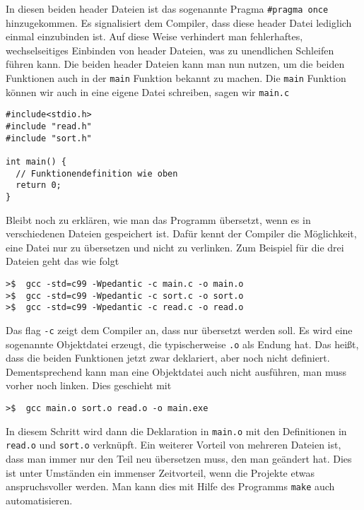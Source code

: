 In diesen beiden header Dateien ist das sogenannte Pragma \verb|#pragma once| hinzugekommen.
Es signalisiert dem Compiler, dass diese header Datei lediglich einmal einzubinden ist.
Auf diese Weise verhindert man fehlerhaftes, wechselseitiges Einbinden von header Dateien, was zu unendlichen Schleifen führen kann.
Die beiden header Dateien kann man nun nutzen, um die beiden Funktionen auch in der \texttt{main} Funktion bekannt zu machen.
Die \texttt{main} Funktion können wir auch in eine eigene Datei schreiben, sagen wir \texttt{main.c}
\begin{lstlisting}[caption={Datei \texttt{main.c}}, belowcaptionskip=0.3em]
#include<stdio.h>
#include "read.h"
#include "sort.h"

int main() {
  // Funktionendefinition wie oben
  return 0;
}
\end{lstlisting}
Bleibt noch zu erklären, wie man das Programm übersetzt, wenn es in verschiedenen Dateien gespeichert ist.
Dafür kennt der Compiler die Möglichkeit, eine Datei nur zu übersetzen und nicht zu verlinken.
Zum Beispiel für die drei Dateien geht das wie folgt

\vspace*{0.5cm}
\begin{verbatim}
>$  gcc -std=c99 -Wpedantic -c main.c -o main.o
>$  gcc -std=c99 -Wpedantic -c sort.c -o sort.o
>$  gcc -std=c99 -Wpedantic -c read.c -o read.o
\end{verbatim}
\vspace*{0.5cm}

Das flag \texttt{-c} zeigt dem Compiler an, dass nur übersetzt werden soll.
Es wird eine sogenannte Objektdatei erzeugt, die typischerweise \texttt{.o} als Endung hat.
Das heißt, dass die beiden Funktionen jetzt zwar deklariert, aber noch nicht definiert.
Dementsprechend kann man eine Objektdatei auch nicht ausführen, man muss vorher noch linken.
Dies geschieht mit

\vspace*{0.5cm}
\begin{verbatim}
>$  gcc main.o sort.o read.o -o main.exe
\end{verbatim}
\vspace*{0.5cm}

In diesem Schritt wird dann die Deklaration in \texttt{main.o} mit den Definitionen in \texttt{read.o} und \texttt{sort.o} verknüpft.
Ein weiterer Vorteil von mehreren Dateien ist, dass man immer nur den Teil neu übersetzen muss, den man geändert hat.
Dies ist unter Umständen ein immenser Zeitvorteil, wenn die Projekte etwas anspruchsvoller werden.
Man kann dies mit Hilfe des Programms \texttt{make} auch automatisieren.

\endinput
